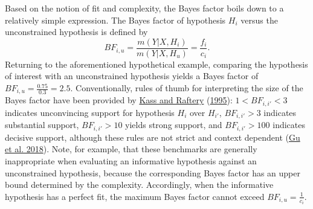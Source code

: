 \documentclass[
  11pt,
]{article}
\begin{document}
Based on the notion of fit and complexity, the Bayes factor boils down to a relatively simple expression.
The Bayes factor of hypothesis \(H_i\) versus the unconstrained hypothesis is defined by
\[
BF_{i,u} = \frac{m(Y | X, H_{i})}{m(Y|X, H_{u})} = \frac{f_i}{c_i}.
\]
Returning to the aforementioned hypothetical example, comparing the hypothesis of interest with an unconstrained hypothesis yields a Bayes factor of \(BF_{i,u} = \frac{0.75}{0.3} = 2.5\).
Conventionally, rules of thumb for interpreting the size of the Bayes factor have been provided by \protect\hyperlink{ref-kass_raftery_bayes_factors_1995}{Kass and Raftery} (\protect\hyperlink{ref-kass_raftery_bayes_factors_1995}{1995}): \(1 < BF_{i,i'} < 3\) indicates unconvincing support for hypothesis \(H_i\) over \(H_{i'}\), \(BF_{i,i'}>3\) indicates substantial support, \(BF_{i,i'}>10\) yields strong support, and \(BF_{i,i'}>100\) indicates decisive support, although these rules are not strict and context dependent (\protect\hyperlink{ref-gu_approximated_2018}{Gu et al. 2018}).
Note, for example, that these benchmarks are generally inappropriate when evaluating an informative hypothesis against an unconstrained hypothesis, because the corresponding Bayes factor has an upper bound determined by the complexity.
Accordingly, when the informative hypothesis has a perfect fit, the maximum Bayes factor cannot exceed \(BF_{i,u} = \frac{1}{c_i}\).
\end{document}
